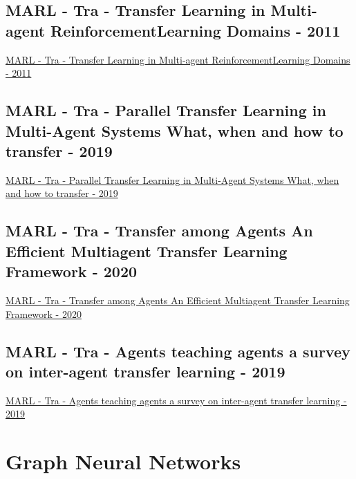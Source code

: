 \subsection{MARL - Tra - Transfer Learning in Multi-agent ReinforcementLearning Domains - 2011}
\href{https://link.springer.com/chapter/10.1007/978-3-642-29946-9_25}{MARL - Tra - Transfer Learning in Multi-agent ReinforcementLearning Domains - 2011}

\subsection{MARL - Tra - Parallel Transfer Learning in Multi-Agent Systems What, when and how to transfer - 2019}
\href{https://ieeexplore.ieee.org/abstract/document/8851784}{MARL - Tra - Parallel Transfer Learning in Multi-Agent Systems What, when and how to transfer - 2019}

\subsection{MARL - Tra - Transfer among Agents An Efficient Multiagent Transfer Learning Framework - 2020}
\href{https://arxiv.org/abs/2002.08030}{MARL - Tra - Transfer among Agents An Efficient Multiagent Transfer Learning Framework - 2020}

\subsection{MARL - Tra - Agents teaching agents a survey on inter-agent transfer learning - 2019}
\href{https://link.springer.com/article/10.1007/s10458-019-09430-0}{MARL - Tra - Agents teaching agents a survey on inter-agent transfer learning - 2019}

\section{Graph Neural Networks}
